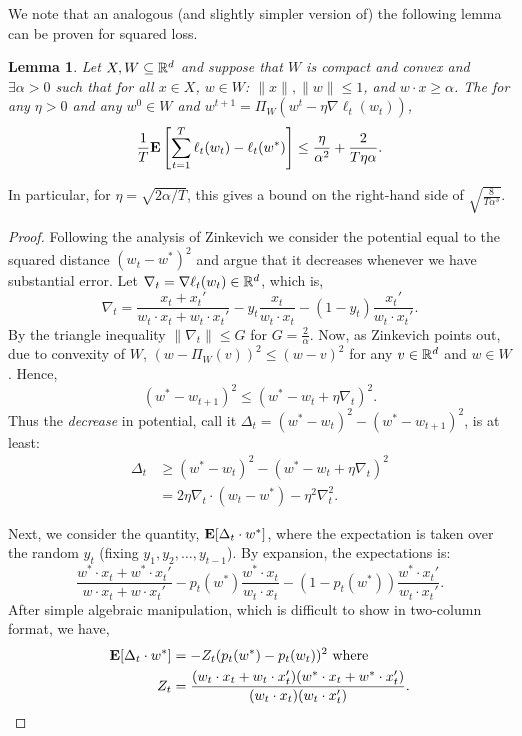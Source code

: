 \documentclass{article}
\newtheorem{lemma}{Lemma}
\begin{document}
We note that an analogous (and slightly simpler version of) the following lemma can be proven for squared loss.
\begin{lemma}\label{lem:rel}
Let $X,W \subseteq \mathbb{R}^d$ and suppose that $W$ is compact and convex and $\exists \alpha >0$ such that for all $x \in X$, $w \in W$:
$\|x\|,\|w\|\leq 1$, and $w \cdot x \geq \alpha$.
The for any $\eta>0$ and any $w^0\in W$ and $w^{t+1}=\Pi_W(w^t-\eta \nabla \ell_t(w_t))$,
$$\frac{1}{T}{\bf E}\left[\sum_{t=1}^T \ell_t(w_t) -\ell_t(w^*)\right] \leq \frac{\eta}{\alpha^2}+\frac{2}{T\eta \alpha}.$$
\end{lemma}
In particular, for $\eta=\sqrt{2\alpha/T}$, this gives a bound on the right-hand side of $\sqrt{\frac{8}{T\alpha^3}}$.
\begin{proof}
Following the analysis of Zinkevich \cite{Zinkevich03} we consider the potential equal to the squared distance $(w_t-w^*)^2$ and argue that it decreases whenever we have substantial error.
Let $\nabla_t = \nabla \ell_t(w_t)\in \mathbb{R}^d$, which is,
$$\nabla_t = \frac{x_t+x_t'}{w_t\cdot x_t+w_t\cdot x_t'} - y_t \frac{x_t}{w_t\cdot x_t} - (1-y_t)\frac{x_t'}{w_t\cdot x_t'}.$$
By the triangle inequality $\|\nabla_t\| \leq G$ for $G=\frac{2}{\alpha}$.  Now, as Zinkevich points out, due to convexity of $W$, $(w-\Pi_W(v))^2\leq (w-v)^2$ for any $v \in \mathbb{R}^d$ and $w \in W$.  Hence,
$$(w^*-w_{t+1})^2 \leq (w^*-w_t+\eta \nabla_t)^2.$$
Thus the {\em decrease} in potential, call it $\Delta_t = (w^*-w_t)^2-(w^*-w_{t+1})^2$, is at least:
\begin{align*}
\Delta_t &\geq (w^*-w_t)^2-(w^*-w_t+\eta \nabla_t)^2 \\
&=2\eta \nabla_t \cdot (w_t-w^*)-\eta^2 \nabla_t^2.
\end{align*}

Next, we consider the quantity,
${\bf E}[ \Delta_t \cdot w^* ]$, where the expectation is taken over the random $y_t$ (fixing $y_1,y_2,\ldots,y_{t-1}$).  By expansion, the expectations is:
$$\frac{w^* \cdot x_t + w^* \cdot x_t'}{w \cdot x_t + w\cdot x_t'} - p_t(w^*) \frac{w^* \cdot x_t}{w_t\cdot x_t} - (1-p_t(w^*))\frac{w^* \cdot x_t'}{w_t\cdot x_t'}.$$
After simple algebraic manipulation, which is difficult to show in two-column format, we have,
\begin{align*}
{\bf E}[\Delta_t \cdot w^*]&=-Z_t(p_t(w^*)-p_t(w_t))^2 \text{ where }\\
Z_t &=\frac{(w_t\cdot x_t+w_t\cdot x_t')(w^*\cdot x_t+w^*\cdot x_t')}{(w_t \cdot x_t)(w_t \cdot x_t')}.
\end{align*}


\end{proof}
\end{document}
